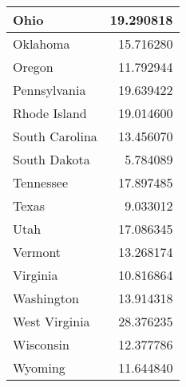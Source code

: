 \begin{table}
\begin{tabular}[t]{l|r}
\hline
Ohio & 19.290818\\
\hline
Oklahoma & 15.716280\\
\hline
Oregon & 11.792944\\
\hline
Pennsylvania & 19.639422\\
\hline
Rhode Island & 19.014600\\
\hline
South Carolina & 13.456070\\
\hline
South Dakota & 5.784089\\
\hline
Tennessee & 17.897485\\
\hline
Texas & 9.033012\\
\hline
Utah & 17.086345\\
\hline
Vermont & 13.268174\\
\hline
Virginia & 10.816864\\
\hline
Washington & 13.914318\\
\hline
West Virginia & 28.376235\\
\hline
Wisconsin & 12.377786\\
\hline
Wyoming & 11.644840\\
\hline
\end{tabular}
\end{table}